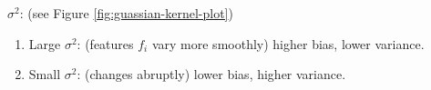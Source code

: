    \par \textbf{$\sigma^2$}: (see Figure \ref{fig:guassian-kernel-plot})
    \begin{enumerate}
        \item Large $\sigma^2$: (features $f_i$ vary more smoothly) higher bias, lower variance.
        \item Small $\sigma^2$: (changes abruptly) lower bias, higher variance.
    \end{enumerate}

